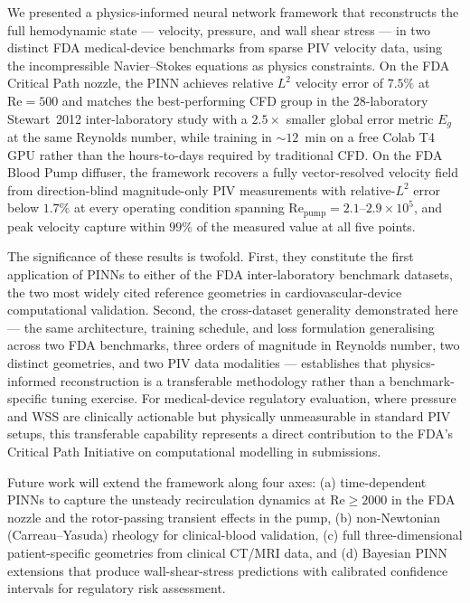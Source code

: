 \documentclass[12pt,a4paper]{article}
\newcommand{\Reyn}{\mathrm{Re}}    %
\begin{document}
We presented a physics-informed neural network framework that
reconstructs the full hemodynamic state --- velocity, pressure,
and wall shear stress --- in two distinct FDA medical-device
benchmarks from sparse PIV velocity data, using the
incompressible Navier--Stokes equations as physics constraints.
On the FDA Critical Path nozzle, the PINN achieves relative
$L^2$ velocity error of $7.5\%$ at $\Reyn = 500$ and matches the
best-performing CFD group in the 28-laboratory Stewart~2012
inter-laboratory study with a $2.5\times$ smaller global error
metric $E_g$ at the same Reynolds number, while training in
$\sim\!12$~min on a free Colab T4 GPU rather than the
hours-to-days required by traditional CFD. On the FDA Blood Pump
diffuser, the framework recovers a fully vector-resolved velocity
field from direction-blind magnitude-only PIV measurements with
relative-$L^2$ error below $1.7\%$ at every operating condition
spanning $\Reyn_{\text{pump}} = 2.1$--$2.9 \times 10^5$, and peak
velocity capture within $99\%$ of the measured value at all five
points.

The significance of these results is twofold. First, they
constitute the first application of PINNs to either of the FDA
inter-laboratory benchmark datasets, the two most widely cited
reference geometries in cardiovascular-device computational
validation. Second, the cross-dataset generality demonstrated
here --- the same architecture, training schedule, and loss
formulation generalising across two FDA benchmarks, three orders
of magnitude in Reynolds number, two distinct geometries, and two
PIV data modalities --- establishes that physics-informed
reconstruction is a transferable methodology rather than a
benchmark-specific tuning exercise. For medical-device regulatory
evaluation, where pressure and WSS are clinically actionable but
physically unmeasurable in standard PIV setups, this transferable
capability represents a direct contribution to the FDA's Critical
Path Initiative on computational modelling in submissions.

Future work will extend the framework along four axes:
(a) time-dependent PINNs to capture the unsteady recirculation
dynamics at $\Reyn \geq 2000$ in the FDA nozzle and the
rotor-passing transient effects in the pump,
(b) non-Newtonian (Carreau--Yasuda) rheology for clinical-blood
validation,
(c) full three-dimensional patient-specific geometries from
clinical CT/MRI data, and
(d) Bayesian PINN extensions
\cite{Yang2021BayesPINN} that produce wall-shear-stress
predictions with calibrated confidence intervals for regulatory
risk assessment.
\end{document}

